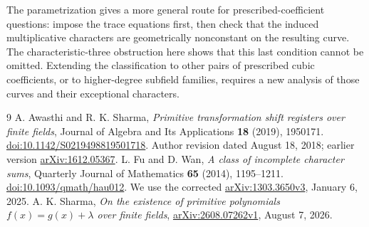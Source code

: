 \documentclass[11pt]{article}
\theoremstyle{remark}\newtheorem{remark}[theorem]{Remark}
\begin{document}
The parametrization gives a more general route for prescribed-coefficient questions: impose the trace equations first, then check that the induced multiplicative characters are geometrically nonconstant on the resulting curve. The characteristic-three obstruction here shows that this last condition cannot be omitted. Extending the classification to other pairs of prescribed cubic coefficients, or to higher-degree subfield families, requires a new analysis of those curves and their exceptional characters.

\begin{thebibliography}{9}
 A. Awasthi and R. K. Sharma, \emph{Primitive transformation shift registers over finite fields}, Journal of Algebra and Its Applications \textbf{18} (2019), 1950171. \href{https://doi.org/10.1142/S0219498819501718}{doi:10.1142/S0219498819501718}. Author revision dated August 18, 2018; earlier version \href{https://arxiv.org/abs/1612.05367}{arXiv:1612.05367}.
 L. Fu and D. Wan, \emph{A class of incomplete character sums}, Quarterly Journal of Mathematics \textbf{65} (2014), 1195--1211. \href{https://doi.org/10.1093/qmath/hau012}{doi:10.1093/qmath/hau012}. We use the corrected \href{https://arxiv.org/abs/1303.3650v3}{arXiv:1303.3650v3}, January 6, 2025.
 A. K. Sharma, \emph{On the existence of primitive polynomials $f(x)=g(x)+\lambda$ over finite fields}, \href{https://arxiv.org/abs/2608.07262v1}{arXiv:2608.07262v1}, August 7, 2026.
\end{thebibliography}
\end{document}
